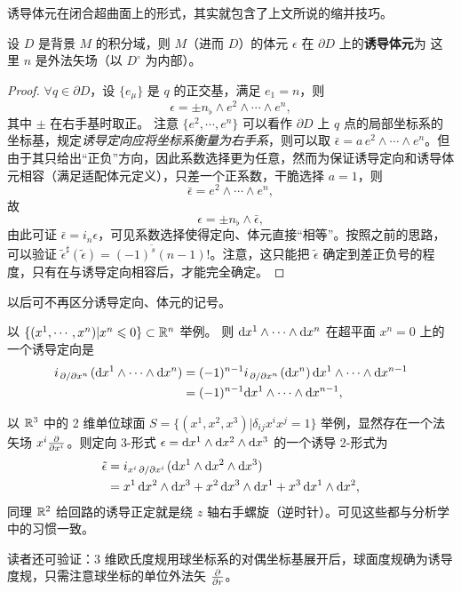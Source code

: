 诱导体元在闭合超曲面上的形式，其实就包含了上文所说的缩并技巧。

\begin{theorem}
    设 $D$ 是背景 $M$ 的积分域，则 $M$（进而 $D$）的体元 $\epsilon$ 在 $\partial D$ 上的\textbf{诱导体元}为
    这里 $n$ 是外法矢场（以 $D^\circ$ 为内部）。
\end{theorem}
\begin{proof}
    $\forall q\in\partial D$，设 $\{e_\mu\}$ 是 $q$ 的正交基，满足 $e_1=n$，则
    \[
    \epsilon=\pm n_\flat\wedge e^2\wedge\cdots\wedge e^n,
    \]
    其中 $\pm$ 在右手基时取正。
    注意 $\{e^2,\cdots, e^n\}$ 可以看作 $\partial D$ 上 $q$ 点的局部坐标系的坐标基，规定\textit{诱导定向应将坐标系衡量为右手系}，则可以取 $\bar\epsilon=a\,e^2\wedge\cdots\wedge e^n$。但由于其只给出“正负”方向，因此系数选择更为任意，然而为保证诱导定向和诱导体元相容（满足适配体元定义），只差一个正系数，干脆选择 $a=1$，则
    \[
    \bar\epsilon=e^2\wedge\cdots\wedge e^n,
    \]
    故
    \[
    \epsilon=\pm n_\flat\wedge \bar\epsilon,
    \]
    由此可证 $\bar\epsilon=i_n\epsilon$，可见系数选择使得定向、体元直接“相等”。按照之前的思路，可以验证 $\tilde\epsilon^\sharp(\tilde\epsilon)=(-1)^{\tilde s}(n-1)!$。注意，这只能把 $\tilde\epsilon$ 确定到差正负号的程度，只有在与诱导定向相容后，才能完全确定。
\end{proof}
以后可不再区分诱导定向、体元的记号。

\begin{example}
    以 $\{(x^1,\cdots,x^n)|x^n\leqslant 0\}\subset\mathbb{R}^n$ 举例。
则 $\dd x^1 \wedge\cdots\wedge \dd x^{n}$ 在超平面 $x^n=0$ 上的一个诱导定向是
\begin{align*}
    i_{\pdv*{x^n}}(\dd x^1 \wedge\cdots\wedge \dd x^{n})&=(-1)^{n-1} i_{\pdv*{x^n}}( \dd x^{n})\,\dd x^1 \wedge\cdots\wedge \dd x^{n-1}\\
    &=(-1)^{n-1} \dd x^1 \wedge\cdots\wedge \dd x^{n-1},
\end{align*}
\end{example}
\begin{example}
    以 $\mathbb{R}^3$ 中的 2 维单位球面 $S=\{(x^1,x^2,x^3)|\delta_{ij} x^i x^j=1\}$ 举例，显然存在一个法矢场 $x^i\pdv{x^i}$。则定向 3-形式 $\epsilon =\dd x^1\wedge\dd x^2\wedge\dd x^3$ 的一个诱导 2-形式为
    \begin{align*}
        \tilde\epsilon &=i_{x^i\pdv*{x^i}}(\dd x^1\wedge\dd x^2\wedge\dd x^3)\\
        &=x^1\,\dd x^2 \wedge \dd x^3 +x^2\,\dd x^3 \wedge \dd x^1 + x^3\,\dd x^1 \wedge \dd x^2,
    \end{align*}
    同理 $\mathbb{R}^2$ 给回路的诱导正定就是绕 $z$ 轴右手螺旋（逆时针）。可见这些都与分析学中的习惯一致。

    读者还可验证：3 维欧氏度规用球坐标系的对偶坐标基展开后，球面度规确为诱导度规，只需注意球坐标的单位外法矢 $\pdv{r}$。
\end{example}

